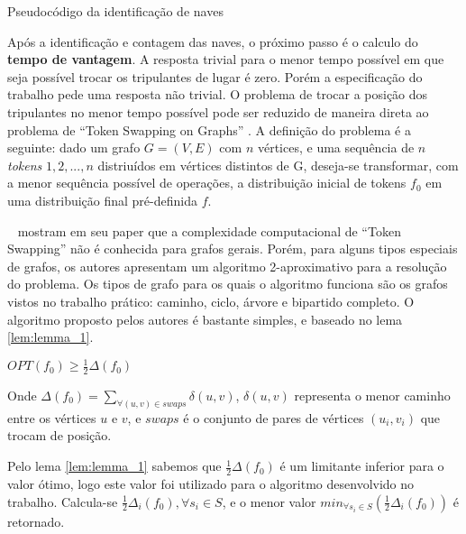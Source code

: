 \begin{algorithm}[tb]
	\caption{Pseudocódigo da identificação de naves}
	\label{alg:check_CC}
\end{algorithm}

Após a identificação e contagem das naves, o próximo passo é o calculo do \textbf{tempo de vantagem}. A resposta trivial para o menor tempo possível em que seja possível trocar os tripulantes de lugar é zero. Porém a especificação do trabalho pede uma resposta não trivial. O problema de trocar a posição dos tripulantes no menor tempo possível pode ser reduzido de maneira direta ao problema de ``Token Swapping on Graphs'' \cite{yamanaka2015swapping}. A definição do problema é a seguinte: dado um grafo $G = (V, E)$ com $n$ vértices, e uma sequência de $n$ \textit{tokens} $1, 2, ..., n$ distriuídos em vértices distintos de G, deseja-se transformar, com a menor sequência possível de operações, a distribuição inicial de tokens $f_0$ em uma distribuição final pré-definida $f$.

\citeauthor{yamanaka2015swapping}~ mostram em seu paper \cite{yamanaka2015swapping} que a complexidade computacional de ``Token Swapping'' não é conhecida para grafos gerais. Porém, para alguns tipos especiais de grafos, os autores apresentam um algoritmo 2-aproximativo para a resolução do problema. Os tipos de grafo para os quais o algoritmo funciona são os grafos vistos no trabalho prático: caminho, ciclo, árvore e bipartido completo. O algoritmo proposto pelos autores é bastante simples, e baseado no lema \ref{lem:lemma_1}.

\begin{lemma}
	$OPT(f_0) \geq \frac{1}{2} \Delta(f_0)$
	\label{lem:lemma_1}
\end{lemma}

Onde $\Delta(f_0) = \sum_{\forall (u, v) \in swaps} \delta(u, v)$, $\delta(u, v)$ representa o menor caminho entre os vértices $u$ e $v$, e $swaps$ é o conjunto de pares de vértices $(u_i, v_i)$ que trocam de posição.

Pelo lema \ref{lem:lemma_1} sabemos que $\frac{1}{2}\Delta(f_0)$ é um limitante inferior para o valor ótimo, logo este valor foi utilizado para o algoritmo desenvolvido no trabalho. Calcula-se $\frac{1}{2}\Delta_i(f_0), \forall s_i \in S$, e o menor valor $min_{\forall s_i \in S}(\frac{1}{2}\Delta_i(f_0))$ é retornado.


